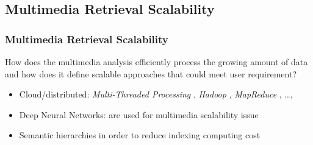 \subsection{Multimedia Retrieval Scalability}
\begin{frame}
	\frametitle{Multimedia Retrieval Scalability}
		How does the multimedia analysis efficiently process the growing amount of data and how does it 
		define scalable approaches that could meet user requirement?
		\begin{itemize}
			\item \alert{Cloud/distributed}: 
			      \emph{Multi-Threaded Processing} {\tiny{\citep{Amit2006}}},  
			      \emph{Hadoop} {\tiny{\citep{White2012,Landset2015}}}, 
			      \emph{MapReduce} {\tiny{\citep{Dean2008,Dean2010}}}, \dots{},
		
			\item \alert{Deep Neural Networks}: are used for multimedia scalability issue 
			{\tiny{\citep{Wu2015,Druzhkov2016}}}
			
			\item \alert{Semantic hierarchies} in order to reduce indexing computing cost
			    {\tiny{\citep{Deng2010,Zhou2014,Ordonez2015}}}
		\end{itemize}
\end{frame}
